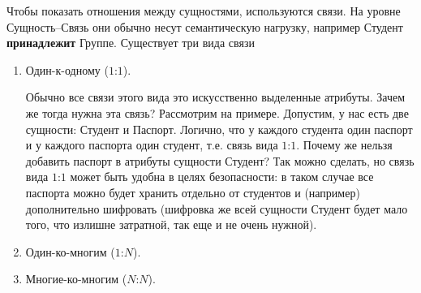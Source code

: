 Чтобы показать отношения между сущностями, используются связи. На уровне
Сущность--Связь они обычно несут семантическую нагрузку, например Студент
\textbf{принадлежит} Группе.
Существует три вида связи
\begin{enumerate}
\item 
  Один-к-одному (\(1\):\(1\)).

  Обычно все связи этого вида это искусственно выделенные атрибуты. Зачем же
  тогда нужна эта связь? Рассмотрим на примере. Допустим, у нас есть две
  сущности: Студент и Паспорт. Логично, что у каждого студента один паспорт и у
  каждого паспорта один студент, т.е. связь вида \(1\):\(1\). Почему же нельзя
  добавить паспорт в атрибуты сущности Студент? Так можно сделать, но связь вида
  \(1\):\(1\) может быть удобна в целях безопасности: в таком случае все
  паспорта можно будет хранить отдельно от студентов и (например) дополнительно
  шифровать (шифровка же всей сущности Студент будет мало того, что излишне
  затратной, так еще и не очень нужной).

\item 
  Один-ко-многим (\(1\):\(N\)).

\item 
  Многие-ко-многим (\(N\):\(N\)).
\end{enumerate}
